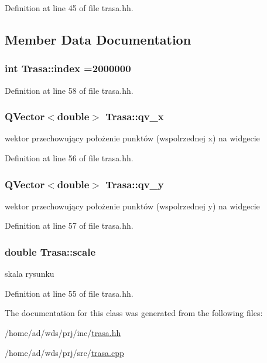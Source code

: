 Definition at line 45 of file trasa.\+hh.



\subsection{Member Data Documentation}
\subsubsection[{\texorpdfstring{index}{index}}]{\setlength{\rightskip}{0pt plus 5cm}int Trasa\+::index =2000000\hspace{0.3cm}{\ttfamily [private]}}\hypertarget{class_trasa_adc9ed75ed0b4a2669128ef2d7ffaf150}{}\label{class_trasa_adc9ed75ed0b4a2669128ef2d7ffaf150}


Definition at line 58 of file trasa.\+hh.

\subsubsection[{\texorpdfstring{qv\+\_\+x}{qv_x}}]{\setlength{\rightskip}{0pt plus 5cm}Q\+Vector$<$double$>$ Trasa\+::qv\+\_\+x\hspace{0.3cm}{\ttfamily [private]}}\hypertarget{class_trasa_a41a6b053dd05d57c1ca3e0c1c26bd504}{}\label{class_trasa_a41a6b053dd05d57c1ca3e0c1c26bd504}
wektor przechowujący położenie punktów (wspolrzednej x) na widgecie 

Definition at line 56 of file trasa.\+hh.

\subsubsection[{\texorpdfstring{qv\+\_\+y}{qv_y}}]{\setlength{\rightskip}{0pt plus 5cm}Q\+Vector$<$double$>$ Trasa\+::qv\+\_\+y\hspace{0.3cm}{\ttfamily [private]}}\hypertarget{class_trasa_a232930dbf4c8396b9251c258813fa0c1}{}\label{class_trasa_a232930dbf4c8396b9251c258813fa0c1}
wektor przechowujący położenie punktów (wspolrzednej y) na widgecie 

Definition at line 57 of file trasa.\+hh.

\subsubsection[{\texorpdfstring{scale}{scale}}]{\setlength{\rightskip}{0pt plus 5cm}double Trasa\+::scale\hspace{0.3cm}{\ttfamily [private]}}\hypertarget{class_trasa_a4bc5fca0e6c9e2d18cfbd7b0ee0a6c47}{}\label{class_trasa_a4bc5fca0e6c9e2d18cfbd7b0ee0a6c47}
skala rysunku 

Definition at line 55 of file trasa.\+hh.



The documentation for this class was generated from the following files\+:\begin{DoxyCompactItemize}
\item 
/home/ad/wds/prj/inc/\hyperlink{trasa_8hh}{trasa.\+hh}\item 
/home/ad/wds/prj/src/\hyperlink{trasa_8cpp}{trasa.\+cpp}\end{DoxyCompactItemize}

